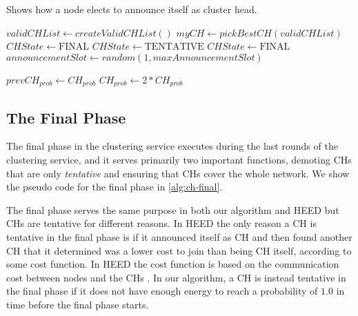 \begin{algorithm}[bt]
\caption{Shows how a node elects to announce itself as cluster head.}
\label{alg:ch-decision}
\begin{algorithmic}[1]
    \State $validCHList \gets createValidCHList()$
     \label{valid-clusters-not-empty}
        \State $myCH \gets pickBestCH(validCHList)$
                \State $CHState \gets \text{FINAL}$
            \Else
                \State $CHState \gets \text{TENTATIVE}$
            \EndIf
        \EndIf
        \State $CHState \gets \text{FINAL}$
        \State $announcementSlot \gets random(1, maxAnnouncementSlot)$
    \EndIf
    
    \State $prevCH_{prob} \gets CH_{prob}$
    \State $CH_{prob} \gets 2 * CH_{prob}$
\EndIf
\EndProcedure
\end{algorithmic}
\end{algorithm}

\subsection{The Final Phase}
\label{subsec:final-phase}
The final phase in the clustering service executes during the last rounds of the clustering service, and it serves primarily two important functions, demoting CHs that are only \emph{tentative} and ensuring that CHs cover the whole network. We show the pseudo code for the final phase in \cref{alg:ch-final}.

The final phase serves the same purpose in both our algorithm and HEED but CHs are tentative for different reasons. In HEED the only reason a CH is tentative in the final phase is if it announced itself as CH and then found another CH that it determined was a lower cost to join than being CH itself, according to some cost function. In HEED the cost function is based on the communication cost between nodes and the CHs \cite{Younis2004-HEED}. In our algorithm, a CH is instead tentative in the final phase if it does not have enough energy to reach a probability of $1.0$ in time before the final phase starts. 

